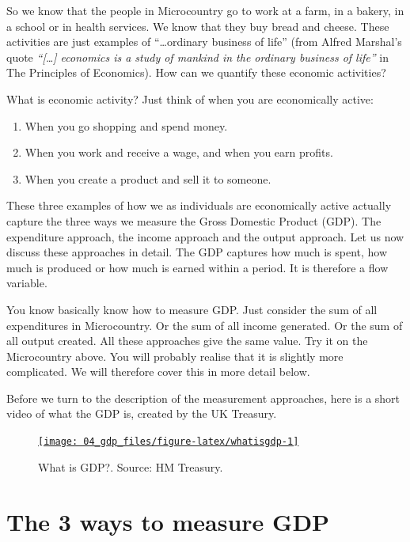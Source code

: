 \documentclass[
]{book}
\providecommand{\tightlist}{%
  \setlength{\itemsep}{0pt}\setlength{\parskip}{0pt}}
\begin{document}
So we know that the people in Microcountry go to work at a farm, in a bakery, in a school or in health services. We know that they buy bread and cheese. These activities are just examples of ``\ldots ordinary business of life'' (from Alfred Marshal's quote \emph{``{[}\ldots{]} economics is a study of mankind in the ordinary business of life''} in The Principles of Economics). How can we quantify these economic activities?

What is economic activity? Just think of when you are economically active:

\begin{enumerate}
\def\labelenumi{\arabic{enumi}.}
\tightlist
\item
  When you go shopping and spend money.
\item
  When you work and receive a wage, and when you earn profits.
\item
  When you create a product and sell it to someone.
\end{enumerate}

These three examples of how we as individuals are economically active actually capture the three ways we measure the Gross Domestic Product (GDP). The expenditure approach, the income approach and the output approach. Let us now discuss these approaches in detail. The GDP captures how much is spent, how much is produced or how much is earned within a period. It is therefore a flow variable.

You know basically know how to measure GDP. Just consider the sum of all expenditures in Microcountry. Or the sum of all income generated. Or the sum of all output created. All these approaches give the same value. Try it on the Microcountry above. You will probably realise that it is slightly more complicated. We will therefore cover this in more detail below.

Before we turn to the description of the measurement approaches, here is a short video of what the GDP is, created by the UK Treasury.

\begin{figure}

{\centering \href{https://www.youtube.com/embed/UOuzPLjwkMc}{\texttt{[image: 04\_gdp\_files/figure-latex/whatisgdp-1]} }

}

\caption{What is GDP?. Source: HM Treasury. }\label{fig:whatisgdp}
\end{figure}

\hypertarget{the-3-ways-to-measure-gdp}{%
\section{The 3 ways to measure GDP}\label{the-3-ways-to-measure-gdp}}
\end{document}
